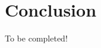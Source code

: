 \documentclass[onehalfspacing,11pt]{article}
\begin{document}
\section{Conclusion}
{\sc To be completed!}
%
%
\end{document}
